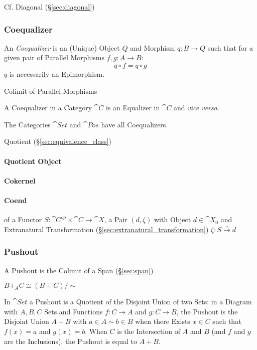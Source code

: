 \fist Cf. Diagonal (\S\ref{sec:diagonal})



\subsubsection{Coequalizer}\label{sec:coequalizer}

An \emph{Coequalizer} is an (Unique) Object $Q$ and Morphism $q: B
\rightarrow Q$ such that for a given pair of Parallel Morphisms $f,g :
A \rightarrow B$:
\[
  q \circ f = q \circ g
\]
$q$ is necessarily an Epimorphism.

Colimit of Parallel Morphisms

A Coequalizer in a Category $\cat{C}$ is an Equalizer in
$\cat{C}$ and \emph{vice versa}.

The Categories $\cat{Set}$ and $\cat{Pos}$ have all
Coequalizers.

Quotient (\S\ref{sec:equivalence_class})



\paragraph{Quotient Object}\label{sec:quotient_object}\hfill

\paragraph{Cokernel}\label{sec:cokernel}\hfill

\paragraph{Coend}\label{sec:coend}\hfill

of a Functor $S : \cat{C}^{op} \times \cat{C} \rightarrow
\cat{X}$, a Pair $(d, \zeta)$ with Object $d \in \cat{X}_0$ and
Extranatural Transformation (\S\ref{sec:extranatural_transformation})
$\zeta : S \xrightarrow{..} d$



\subsubsection{Pushout}\label{sec:pushout}

A Pushout is the Colimit of a Span (\S\ref{sec:span})

$B +_A C \cong (B + C)/\sim$

In $\cat{Set}$ a Pushout is a Quotient of the Disjoint Union of two
Sets: in a Diagram with $A,B,C$ Sets and Functions $f : C \rightarrow
A$ and $g : C \rightarrow B$, the Pushout is the Disjoint Union $A +
B$ with $a \in A \sim b \in B$ when there Exists $x \in C$ such that
$f(x) = a$ and $g(x) = b$. When $C$ is the Intersection of $A$ and $B$
(and $f$ and $g$ are the Inclusions), the Pushout is equal to $A + B$.

